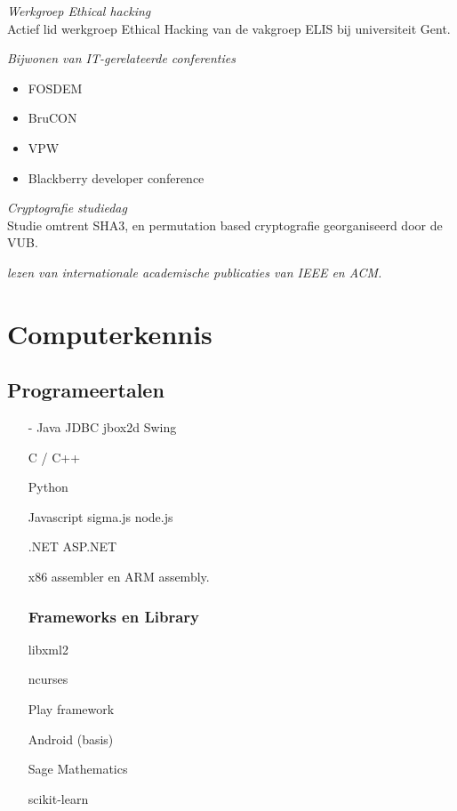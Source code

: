 \documentclass[margin, 10pt]{res} %
\begin{document}
\begin{resume}
{\sl Werkgroep Ethical hacking} \\
Actief lid werkgroep Ethical Hacking van de vakgroep ELIS bij universiteit Gent.

{\sl Bijwonen van IT-gerelateerde conferenties}
\begin{itemize} \itemsep -2pt
\item FOSDEM
\item BruCON
\item VPW
\item Blackberry developer conference
\end{itemize}

{\sl Cryptografie studiedag} \\
Studie omtrent SHA3, en permutation based cryptografie georganiseerd door de VUB.

{\sl lezen van internationale academische publicaties van IEEE en ACM.}

\end{resume}
\pagebreak
\section{Computerkennis}
\subsection{Programeertalen}
\begin{multicols}{2}
\begin{enumerate}
\item[-] Java
\subitem JDBC
\subitem jbox2d
\subitem Swing
\item[] C / C++
\item[] Python
\item[] Javascript
\subitem sigma.js
\subitem node.js
\item[] .NET
\subitem ASP.NET
\item[] x86 assembler en ARM assembly.
\subsubsection*{Frameworks en Library}
\item[] libxml2
\item[] ncurses
\item[] Play framework
\item[] Android (basis)
\item[] Sage Mathematics
\item[] scikit-learn
\end{enumerate}
\end{multicols}
\end{document}

